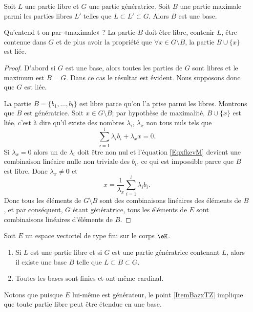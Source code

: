 \begin{lemma}   \label{LemkUfzHl}
    Soit \( L\) une partie libre et \( G\) une partie génératrice. Soit \( B\) une partie maximale parmi les parties libres \( L'\) telles que \( L\subset L'\subset G\). Alors \( B\) est une base.
\end{lemma}
Qu'entend-t-on par «maximale» ? La partie \( B\) doit être libre, contenir \( L\), être contenue dans \( G\) et de plus avoir la propriété que \( \forall x\in G\setminus B\), la partie \( B\cup\{ x \}\) est liée.

\begin{proof}
    D'abord si \( G\) est une base, alors toutes les parties de \( G\) sont libres et le maximum est \( B=G\). Dans ce cas le résultat est évident. Nous supposons donc que \( G\) est liée.

    La partie \( B=\{ b_1,\ldots, b_l \}\) est libre parce qu'on l'a prise parmi les libres. Montrons que \( B\) est génératrice. Soit \( x\in G\setminus B\); par hypothèse de maximalité, \( B\cup\{ x \}\) est liée, c'est à dire qu'il existe des nombres \( \lambda_i\), \( \lambda_x\) non tous nuls tels que
    \begin{equation}    \label{EqxfkevM}
        \sum_{i=1}^l\lambda_ib_i+\lambda_xx=0.
    \end{equation}
    Si \( \lambda_x=0\) alors un de \( \lambda_i\) doit être non nul et l'équation \eqref{EqxfkevM} devient une combinaison linéaire nulle non triviale des \( b_i\), ce qui est impossible parce que \( B\) est libre. Donc \( \lambda_x\neq 0\) et
    \begin{equation}
        x=\frac{1}{ \lambda_x }\sum_{i=1}^l\lambda_ib_i.
    \end{equation}
    Donc tous les éléments de \( G\setminus B\) sont des combinaisons linéaires des éléments de \( B\), et par conséquent, \( G\) étant génératrice, tous les éléments de \( E\) sont combinaisons linéaires d'éléments de \( B\). 
\end{proof}

\begin{theorem} \label{ThonmnWKs}
    Soit \( E\) un espace vectoriel de type fini sur le corps \( \eK\).
    \begin{enumerate}
        \item   \label{ItemBazxTZ}
            Si \( L\) est une partie libre et si \( G\) est une partie génératrice contenant \( L\), alors il existe une base \( B\) telle que \( L\subset B\subset G\).
        \item
            Toutes les bases sont finies et ont même cardinal.
    \end{enumerate}
\end{theorem}
Notons que puisque \( E\) lui-même est générateur, le point \ref{ItemBazxTZ} implique que toute partie libre peut être étendue en une base.


